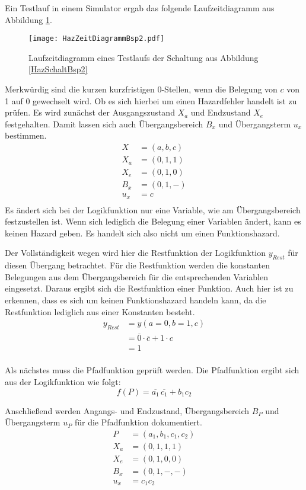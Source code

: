 Ein Testlauf in einem Simulator ergab das folgende Laufzeitdiagramm aus Abbildung \ref{HazZeitDiagBsp2}.
\begin{figure}[htp]
	\centering
	\texttt{[image: HazZeitDiagrammBsp2.pdf]}
	\caption{Laufzeitdiagramm eines Testlaufs der Schaltung aus Abbildung \ref{HazSchaltBsp2}}
	\label{HazZeitDiagBsp2}
\end{figure} 

Merkwürdig sind die kurzen kurzfristigen 0-Stellen, wenn die Belegung von $c$ von 1 auf 0 gewechselt wird. Ob es sich hierbei um einen Hazardfehler handelt ist zu prüfen. Es wird zunächst der Ausgangszustand $X_a$ und Endzustand $X_e$ festgehalten. Damit lassen sich auch Übergangsbereich $B_x$ und Übergangsterm $u_x$ bestimmen.
\begin{align*}
X   &= (a,b,c) \\
X_a &= (0,1,1) \\
X_e &= (0,1,0) \\
B_x &= (0,1,-) \\
u_x &= c \\
\end{align*}
Es ändert sich bei der Logikfunktion nur eine Variable, wie am Übergangsbereich festzustellen ist. Wenn sich lediglich die Belegung einer Variablen ändert, kann es keinen Hazard geben. Es handelt sich also nicht um einen Funktionshazard.

Der Vollständigkeit wegen wird hier die Restfunktion der Logikfunktion $y_{Rest}$ für diesen Übergang betrachtet. Für die Restfunktion werden die konstanten Belegungen aus dem Übergangsbereich für die entsprechenden Variablen eingesetzt. Daraus ergibt sich die Restfunktion einer Funktion. Auch hier ist zu erkennen, dass es sich um keinen Funktionshazard handeln kann, da die Restfunktion lediglich aus einer Konstanten besteht.
\begin{align*}
y_{Rest} &= y(a=0,b=1,c) \\ 
         &= \overline{0} \cdot \overline{c} + 1 \cdot c \\ 
         &= 1 \\
\end{align*}

Als nächstes muss die Pfadfunktion geprüft werden. Die Pfadfunktion ergibt sich aus der Logikfunktion wie folgt:
$$f(P) = \overline{a_1}\hspace{2pt}\overline{c_1}  + b_1c_2$$

Anschließend werden Angangs- und Endzustand, Übergangsbereich $B_P$ und Übergangsterm $u_P$ für die Pfadfunktion dokumentiert.
\begin{align*}
P   &= (a_1,b_1,c_1, c_2) \\
X_a &= (0,1,1,1) \\
X_e &= (0,1,0,0) \\
B_x &= (0,1,-,-) \\
u_x &= c_1c_2 \\
\end{align*}

